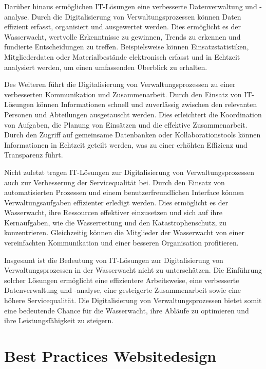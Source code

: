 \documentclass[fontsize=12pt,openright,oneside,paper=a4,BCOR=1cm]{scrbook}
\begin{document}
Darüber hinaus ermöglichen IT-Lösungen eine verbesserte Datenverwaltung und -analyse. Durch die Digitalisierung von Verwaltungsprozessen können Daten effizient erfasst, organisiert und ausgewertet werden. Dies ermöglicht es der Wasserwacht, wertvolle Erkenntnisse zu gewinnen, Trends zu erkennen und fundierte Entscheidungen zu treffen. Beispielsweise können Einsatzstatistiken, Mitgliederdaten oder Materialbestände elektronisch erfasst und in Echtzeit analysiert werden, um einen umfassenden Überblick zu erhalten.

Des Weiteren führt die Digitalisierung von Verwaltungsprozessen zu einer verbesserten Kommunikation und Zusammenarbeit. Durch den Einsatz von IT-Lösungen können Informationen schnell und zuverlässig zwischen den relevanten Personen und Abteilungen ausgetauscht werden. Dies erleichtert die Koordination von Aufgaben, die Planung von Einsätzen und die effektive Zusammenarbeit. Durch den Zugriff auf gemeinsame Datenbanken oder Kollaborationstools können Informationen in Echtzeit geteilt werden, was zu einer erhöhten Effizienz und Transparenz führt.

Nicht zuletzt tragen IT-Lösungen zur Digitalisierung von Verwaltungsprozessen auch zur Verbesserung der Servicequalität bei. Durch den Einsatz von automatisierten Prozessen und einem benutzerfreundlichen Interface können Verwaltungsaufgaben effizienter erledigt werden. Dies ermöglicht es der Wasserwacht, ihre Ressourcen effektiver einzusetzen und sich auf ihre Kernaufgaben, wie die Wasserrettung und den Katastrophenschutz, zu konzentrieren. Gleichzeitig können die Mitglieder der Wasserwacht von einer vereinfachten Kommunikation und einer besseren Organisation profitieren.

Insgesamt ist die Bedeutung von IT-Lösungen zur Digitalisierung von Verwaltungsprozessen in der Wasserwacht nicht zu unterschätzen. Die Einführung solcher Lösungen ermöglicht eine effizientere Arbeitsweise, eine verbesserte Datenverwaltung und -analyse, eine gesteigerte Zusammenarbeit sowie eine höhere Servicequalität. Die Digitalisierung von Verwaltungsprozessen bietet somit eine bedeutende Chance für die Wasserwacht, ihre Abläufe zu optimieren und ihre Leistungsfähigkeit zu steigern.

\section{Best Practices Websitedesign}

\end{document}
